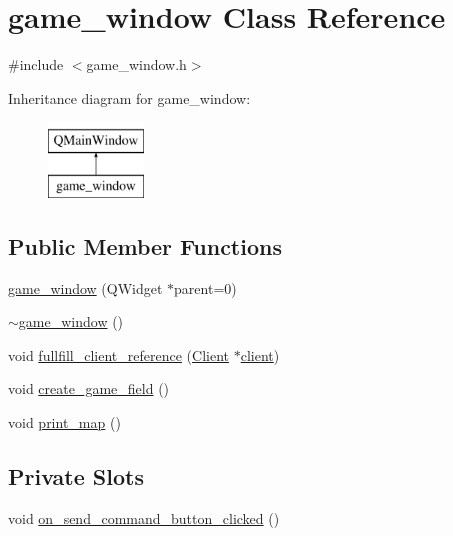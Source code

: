 \hypertarget{classgame__window}{\section{game\-\_\-window Class Reference}
\label{classgame__window}
}


{\ttfamily \#include $<$game\-\_\-window.\-h$>$}

Inheritance diagram for game\-\_\-window\-:\begin{figure}[H]
\begin{center}
\leavevmode
\includegraphics[height=2.000000cm]{classgame__window}
\end{center}
\end{figure}
\subsection*{Public Member Functions}
\begin{DoxyCompactItemize}
\item 
\hyperlink{classgame__window_ab5c211ed2b0c1f224bab4a38bd1b6949}{game\-\_\-window} (Q\-Widget $\ast$parent=0)
\item 
\hyperlink{classgame__window_a9766be5a2cd86e94a14618f5a2817aad}{$\sim$game\-\_\-window} ()
\item 
void \hyperlink{classgame__window_a5f515ec0cce41575760ed2e11dd43192}{fullfill\-\_\-client\-\_\-reference} (\hyperlink{classClient}{Client} $\ast$\hyperlink{classgame__window_a5d8487b5833826ceb57f78dd4df08a36}{client})
\item 
void \hyperlink{classgame__window_a2b6b63f1366a2ae287097ba571230752}{create\-\_\-game\-\_\-field} ()
\item 
void \hyperlink{classgame__window_a9ac4ef3fad106217a101ed1b0324636f}{print\-\_\-map} ()
\end{DoxyCompactItemize}
\subsection*{Private Slots}
\begin{DoxyCompactItemize}
\item 
void \hyperlink{classgame__window_a81dcbe35cf90a64db2728139a800a782}{on\-\_\-send\-\_\-command\-\_\-button\-\_\-clicked} ()
\end{DoxyCompactItemize}
